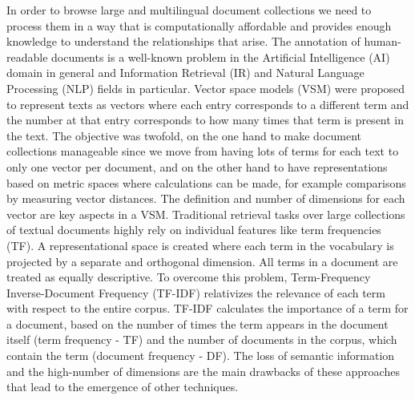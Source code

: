 In order to browse large and multilingual document collections we need to process them in a way that is computationally affordable and provides enough knowledge to understand the relationships that arise. The annotation of human-readable documents is a well-known problem in the Artificial Intelligence (AI) domain in general and Information Retrieval (IR) and Natural Language Processing (NLP) fields in particular. Vector space models (VSM) \citep{Salton1983} were proposed to represent texts as vectors where each entry corresponds to a different term and the number at that entry corresponds to how many times that term is present in the text. The objective was twofold, on the one hand to make document collections manageable since we move from having lots of terms for each text to only one vector per document, and on the other hand to have representations based on metric spaces where calculations can be made, for example comparisons by measuring vector distances. The definition and number of dimensions for each vector are key aspects in a VSM. Traditional retrieval tasks over large collections of textual documents highly rely on individual features like term frequencies (TF)\citep{Hearst1999}. A representational space is created where each term in the vocabulary is projected by a separate and orthogonal dimension. All terms in a document are treated as equally descriptive. To overcome this problem, Term-Frequency Inverse-Document Frequency (TF-IDF) \citep{Manning2008} relativizes the relevance of each term with respect to the entire corpus. TF-IDF calculates the importance of a term for a document, based on the number of times the term appears in the document itself (term frequency - TF) and the number of documents in the corpus, which contain the term (document frequency - DF). The loss of semantic information and the high-number of dimensions are the main drawbacks of these approaches that lead to the emergence of other techniques. 

